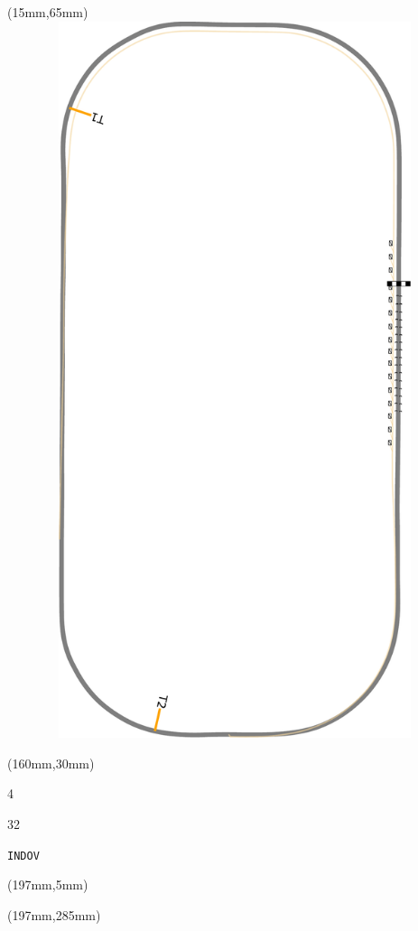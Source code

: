 \begin{textblock*}{185mm}(15mm,65mm)%
\centering
\mbox{\includegraphics[width=185mm,height=210mm,keepaspectratio]{PT/INDOV.pdf}}
\end{textblock*}
\begin{textblock*}{40mm}(160mm,30mm)%
\Large
\par{} 
\par4 
\par32 
\par\hfill\tiny\tt INDOV\\
\end{textblock*}
\begin{textblock*}{20mm}(197mm,5mm)%
\fbox{\thepage}
\label{INDOV}
\end{textblock*}
\begin{textblock*}{20mm}(197mm,285mm)%
\fbox{\thepage}
\end{textblock*}

